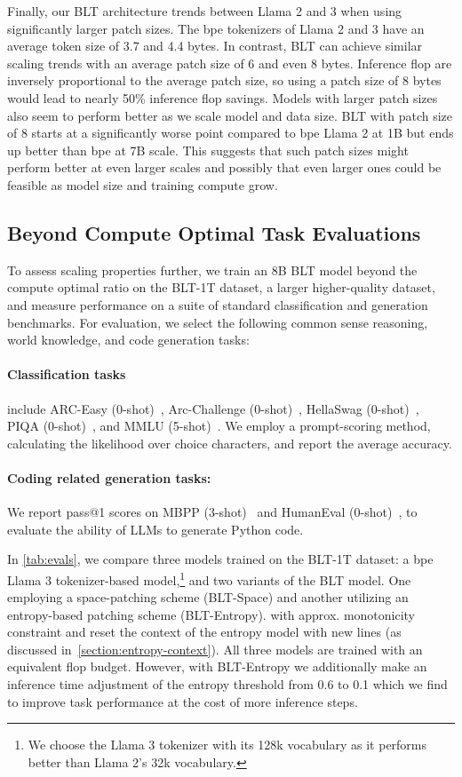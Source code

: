 Finally, our {\textsc BLT} architecture trends between Llama 2 and 3 when using significantly larger patch sizes. The bpe tokenizers of Llama 2 and 3 have an average token size of 3.7 and 4.4 bytes. In contrast, {\textsc BLT} can achieve similar scaling trends with an average patch size of 6 and even 8 bytes. Inference flop are inversely proportional to the average patch size, so using a patch size of 8 bytes would lead to nearly 50\% inference flop savings. Models with larger patch sizes also seem to perform better as we scale model and data size. {\textsc BLT} with patch size of 8 starts at a significantly worse point compared to bpe Llama 2 at 1B but ends up better than bpe at 7B scale. This suggests that such patch sizes might perform better at even larger scales and possibly that even larger ones could be feasible as model size and training compute grow. 

\subsection{Beyond Compute Optimal Task Evaluations}
\label{section:evals}
To assess scaling properties further, we train an 8B {\textsc BLT} model beyond the compute optimal ratio on the {\textsc BLT}-1T dataset, a larger higher-quality dataset, and measure performance on a suite of standard classification and generation benchmarks. For evaluation, we select the following common sense reasoning, world knowledge, and code generation tasks:
\paragraph{Classification tasks} include ARC-Easy (0-shot)~\citep{Eval_ARC}, Arc-Challenge (0-shot)~\citep{Eval_ARC}, HellaSwag (0-shot)~\citep{Eval_hellaswag}, PIQA (0-shot)~\citep{Eval_piqa}, and MMLU (5-shot)~\citep{hendrycks2020measuring}.  We employ a prompt-scoring method, calculating the likelihood over choice characters, and report the average accuracy.
\paragraph{Coding related generation tasks:}  We report pass@1 scores on MBPP (3-shot)~\citep{Eval_MBPP} and HumanEval (0-shot)~\citep{Eval_HumanEval}, to evaluate the ability of LLMs to generate Python code.

In \autoref{tab:evals}, we compare three models trained on the {\textsc BLT}-1T dataset: a bpe Llama 3 tokenizer-based model,\footnote{We choose the Llama 3 tokenizer with its 128k vocabulary as it performs better than Llama 2's 32k vocabulary.} and two variants of the {\textsc BLT} model. One employing a space-patching scheme ({\textsc BLT}-Space) and another utilizing an entropy-based patching scheme ({\textsc BLT}-Entropy). with approx. monotonicity constraint and reset the context of the entropy model with new lines (as discussed in~\autoref{section:entropy-context}). All three models are trained with an equivalent flop budget. However, with {\textsc BLT}-Entropy we additionally make an inference time adjustment of the entropy threshold from 0.6 to 0.1 which we find to improve task performance at the cost of more inference steps.

